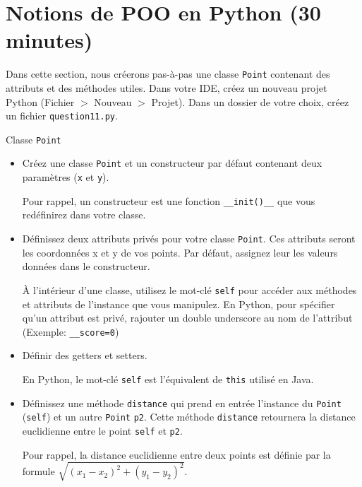 \section{Notions de POO en Python (30 minutes)}
\label{sec:notions_python}
Dans cette section, nous créerons pas-à-pas une classe \lstinline{Point} contenant des attributs et des méthodes utiles.
Dans votre IDE, créez un nouveau projet Python (Fichier $>$ Nouveau $>$ Projet). Dans un dossier de votre choix, créez un fichier \lstinline{question11.py}.\\
\begin{Exercice}[15 minutes] Classe \lstinline{Point}
    \begin{itemize}
        \item Créez une classe \lstinline{Point} et un constructeur par défaut contenant deux paramètres (\lstinline{x} et \lstinline{y}).
        \begin{conseil}
            Pour rappel, un constructeur est une fonction \lstinline{__init()__} que vous redéfinirez dans votre classe.
        \end{conseil}
        \item Définissez deux attributs privés pour votre classe \lstinline{Point}. Ces attributs seront les coordonnées x et y de vos points. Par défaut, assignez leur les valeurs données dans le constructeur.
        \begin{conseil}
            À l'intérieur d'une classe, utilisez le mot-clé \lstinline{self} pour accéder aux méthodes et attributs de l'instance que vous manipulez.
            En Python, pour spécifier qu'un attribut est privé, rajouter un double underscore au nom de l'attribut (Exemple: \lstinline{__score=0})
        \end{conseil}
        \item Définir des getters et setters.
        \begin{conseil}
            En Python, le mot-clé \lstinline{self} est l'équivalent de \lstinline{this} utilisé en Java.
        \end{conseil}
        \item Définissez une méthode \lstinline{distance} qui prend en entrée l'instance du \lstinline{Point} (\lstinline{self}) et un autre \lstinline{Point} \lstinline{p2}. Cette méthode \lstinline{distance} retournera la distance euclidienne entre le point \lstinline{self} et \lstinline{p2}. 
        \begin{conseil}
            Pour rappel, la distance euclidienne entre deux points est définie par la formule $\sqrt{(x_1 - x_2)^2 + (y_1 - y_2)^2}$.

\end{conseil}
\end{itemize}
\end{Exercice}
